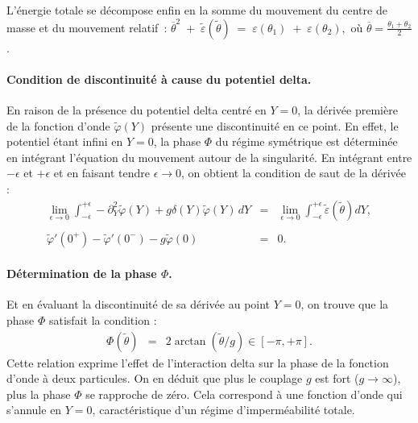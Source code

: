L’énergie totale se décompose enfin en la somme du mouvement du centre
de masse et du mouvement relatif :
\(
   \overline{\theta}^{2}
   \;+\;
   \tilde{\varepsilon}(\tilde{\theta})
   \;=\;
   \varepsilon(\theta_{1})
   \;+\;
   \varepsilon(\theta_{2}),
\)
où \(\overline{\theta}= \tfrac{\theta_{1}+\theta_{2}}{2}\).


\paragraph{Condition de discontinuité à cause du potentiel delta.}
En raison de la présence du potentiel delta centré en $Y = 0$, la dérivée première de la fonction d’onde $\tilde{\varphi}(Y)$ présente une discontinuité en ce point. En effet, le potentiel étant infini en $Y = 0$, la phase $\Phi$ du régime symétrique est déterminée en intégrant l’équation du mouvement autour de la singularité. En intégrant entre $- \epsilon$ et $+ \epsilon$ et en faisant tendre $\epsilon \to 0$, on obtient la condition de saut de la dérivée :
\begin{eqnarray*}
	\underset{ \epsilon \to 0 }{\lim} \int_{-\epsilon}^{+\epsilon}  - 	\partial_Y^2\tilde{\varphi}(Y) + g \delta ( Y )\tilde{\varphi}(Y) \, dY  & = & \underset{ \epsilon \to 0 }{\lim}  \int_{-\epsilon}^{+\epsilon}  \tilde{\varepsilon}(\tilde{\theta})d Y ,\\
	\\
	\tilde{\varphi}'(0^+) - \tilde{\varphi}'(0^-) - g \tilde{\varphi} (  0 ) & = & 0 .
\end{eqnarray*}


\paragraph{Détermination de la phase $\Phi$.}
Et en évaluant la discontinuité de sa dérivée au point $Y = 0$, on trouve que la phase $\Phi$ satisfait la condition :
\begin{eqnarray}\label{chap:1:dif.mod.2.part.2}
	\Phi(\tilde{\theta}) & = & 2 \arctan (\tilde{\theta}/g) \in [ - \pi , +\pi ].
\end{eqnarray}
Cette relation exprime l’effet de l’interaction delta sur la phase de la fonction d’onde à deux particules. On en déduit que plus le couplage \( g \) est fort (\( g \to \infty \)), plus la phase \( \Phi \) se rapproche de zéro. Cela correspond à une fonction d’onde qui s’annule en \( Y = 0 \), caractéristique d’un régime d’imperméabilité totale.

